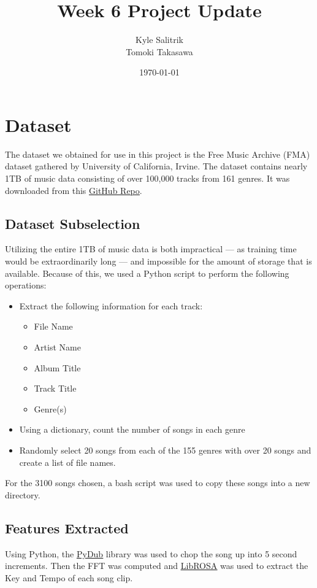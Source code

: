 \documentclass[10pt]{article}
\title{Week 6 Project Update}
\author{Kyle Salitrik \\ Tomoki Takasawa}
\date{\today}
\begin{document}
\begin{titlepage}
\maketitle
\end{titlepage}

\linespread{1.15} %


\section{Dataset}
The dataset we obtained for use in this project is the Free Music Archive (FMA) dataset gathered by University of California, Irvine. The dataset contains nearly 1TB of music data consisting of over 100,000 tracks from 161 genres. It was downloaded from this \href{https://github.com/mdeff/fma}{\underline{GitHub Repo}}.

\subsection{Dataset Subselection}
Utilizing the entire 1TB of music data is both impractical --- as training time would be extraordinarily long --- and impossible for the amount of storage that is available. Because of this, we used a Python script to perform the following operations:
\begin{itemize}
	\setlength{\itemsep}{1pt}
	\setlength{\parskip}{0pt}
	\setlength{\parsep}{0pt}
    \item Extract the following information for each track:
    	\begin{itemize}
    		\item File Name
            \item Artist Name
            \item Album Title
            \item Track Title
            \item Genre(s)
    	\end{itemize}
    \item Using a dictionary, count the number of songs in each genre
    \item Randomly select 20 songs from each of the 155 genres with over 20 songs and create a list of file names.
\end{itemize}

For the 3100 songs chosen, a bash script was used to copy these songs into a new directory. 

\subsection{Features Extracted}
Using Python, the \href{https://github.com/jiaaro/pydub/}{\underline{PyDub}} library was used to chop the song up into 5 second increments. Then the FFT was computed and \href{https://github.com/librosa/librosa}{\underline{LibROSA}} was used to extract the Key and Tempo of each song clip.
\end{document}
